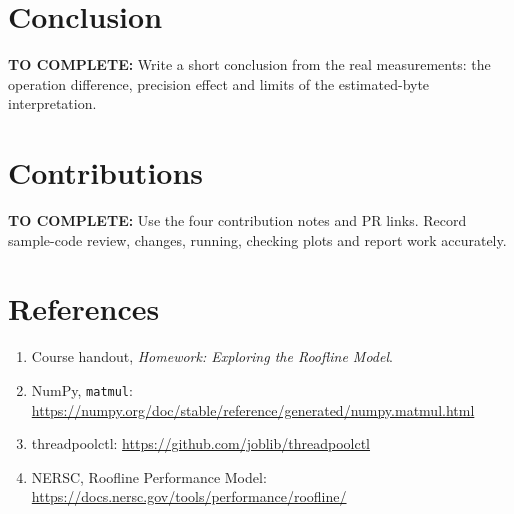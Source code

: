 \documentclass[11pt,a4paper]{article}
\newcommand{\todo}[1]{\par\textcolor{rose}{\textbf{TO COMPLETE:} #1}\par}
\begin{document}
\section{Conclusion}
\todo{Write a short conclusion from the real measurements: the operation
difference, precision effect and limits of the estimated-byte interpretation.}

\section{Contributions}
\todo{Use the four contribution notes and PR links. Record sample-code review,
changes, running, checking plots and report work accurately.}

\section*{References}
\begin{enumerate}
\item Course handout, \emph{Homework: Exploring the Roofline Model}.
\item NumPy, \texttt{matmul}:\\
\url{https://numpy.org/doc/stable/reference/generated/numpy.matmul.html}
\item threadpoolctl: \url{https://github.com/joblib/threadpoolctl}
\item NERSC, Roofline Performance Model:\\
\url{https://docs.nersc.gov/tools/performance/roofline/}
\end{enumerate}
\end{document}
